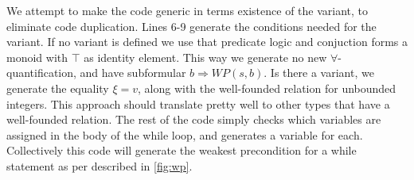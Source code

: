 We attempt to make the code generic in terms existence of the variant, to eliminate code duplication.
Lines 6-9 generate the conditions needed for the variant.
If no variant is defined we use that predicate logic and conjuction forms a monoid with $\top$ as identity element.
This way we generate no new $\forall$-quantification, and have subformular $b \Rightarrow WP(s,b)$.
Is there a variant, we generate the equality $\xi = v$, along with the well-founded relation for unbounded integers. 
This approach should translate pretty well to other types that have a well-founded relation. 
The rest of the code simply checks which variables are assigned in the body of the while loop, and generates a variable for each. 
Collectively this code will generate the weakest precondition for a while statement as per described in \ref{fig:wp}.

